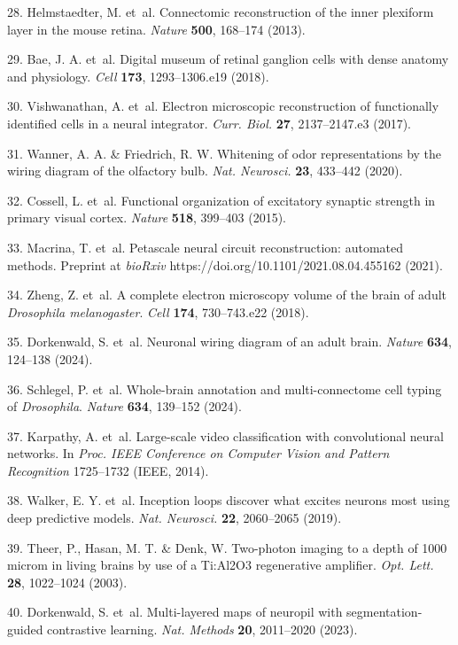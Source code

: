 \documentclass{article}
\begin{document}
\begin{hangpars}
28. Helmstaedter, M. et~al. Connectomic reconstruction of the inner plexiform layer in the mouse retina. \emph{Nature} \textbf{500}, 168–174 (2013). 

29. Bae, J. A. et~al. Digital museum of retinal ganglion cells with dense anatomy and physiology. \emph{Cell} \textbf{173}, 1293–1306.e19 (2018). 

30. Vishwanathan, A. et~al. Electron microscopic reconstruction of functionally identified cells in a neural integrator. \emph{Curr. Biol.} \textbf{27}, 2137–2147.e3 (2017). 

31. Wanner, A. A. \& Friedrich, R. W. Whitening of odor representations by the wiring diagram of the olfactory bulb. \emph{Nat. Neurosci.} \textbf{23}, 433–442 (2020). 

32. Cossell, L. et~al. Functional organization of excitatory synaptic strength in primary visual cortex. \emph{Nature} \textbf{518}, 399–403 (2015). 

33. Macrina, T. et~al. Petascale neural circuit reconstruction: automated methods. Preprint at \emph{bioRxiv} https://doi.org/10.1101/2021.08.04.455162 (2021). 

34. Zheng, Z. et~al. A complete electron microscopy volume of the brain of adult \emph{Drosophila melanogaster}. \emph{Cell} \textbf{174}, 730–743.e22 (2018). 

35. Dorkenwald, S. et~al. Neuronal wiring diagram of an adult brain. \emph{Nature} \textbf{634}, 124–138 (2024). 

36. Schlegel, P. et~al. Whole-brain annotation and multi-connectome cell typing of \emph{Drosophila}. \emph{Nature} \textbf{634}, 139–152 (2024).~ 

37. Karpathy, A. et~al. Large-scale video classification with convolutional neural networks. In \emph{Proc. IEEE Conference on Computer Vision and Pattern Recognition} 1725–1732 (IEEE, 2014). 

38. Walker, E. Y. et~al. Inception loops discover what excites neurons most using deep predictive models. \emph{Nat. Neurosci.} \textbf{22}, 2060–2065 (2019). 

39. Theer, P., Hasan, M. T. \& Denk, W. Two-photon imaging to a depth of 1000 microm in living brains by use of a Ti:Al2O3 regenerative amplifier. \emph{Opt. Lett.} \textbf{28}, 1022–1024 (2003). 

40. Dorkenwald, S. et~al. Multi-layered maps of neuropil with segmentation-guided contrastive learning. \emph{Nat. Methods} \textbf{20}, 2011–2020 (2023). 


\end{hangpars}
\end{document}
